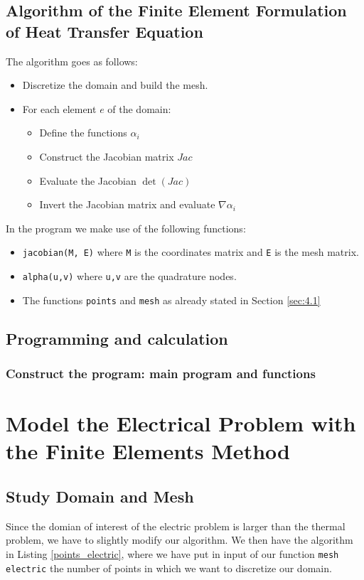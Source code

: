 \subsection{Algorithm of the Finite Element Formulation of Heat Transfer Equation}
The algorithm goes as follows:
\begin{itemize}
	\item Discretize the domain and build the mesh.
	\item For each element $ e $ of the domain:
	\begin{itemize}
		\item Define the functions $ \alpha_i $
		\item Construct the Jacobian matrix $ Jac $
		\item Evaluate the Jacobian $ \det(Jac) $
		\item Invert the Jacobian matrix and evaluate $ \nabla \alpha_i $
	\end{itemize}
\end{itemize}

In the program we make use of the following functions:
\begin{itemize}
	\item \texttt{jacobian(M, E)} where \texttt{M} is the coordinates matrix and \texttt{E} is the mesh matrix.
	\item \texttt{alpha(u,v)} where \texttt{u,v} are the quadrature nodes.
	\item The functions \texttt{points} and \texttt{mesh} as already stated in Section \ref{sec:4.1} 
\end{itemize}



\subsection{Programming and calculation}
\subsubsection{Construct the program: main program and functions}




\section{Model the Electrical Problem with the Finite Elements Method}
\subsection{Study Domain and Mesh}
Since the domian of interest of the electric problem is larger than the thermal problem, we have to slightly modify our algorithm. We then have the algorithm in Listing \ref{points_electric}, where we have put in input of our function \texttt{mesh electric} the number of points in which we want to discretize our domain.
   
